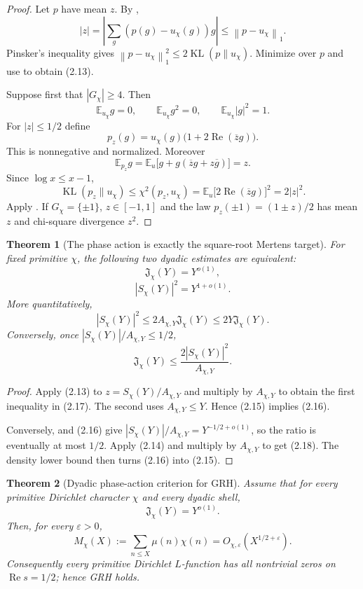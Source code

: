\documentclass[11pt]{article}
\newtheorem{theorem}{Theorem}[section]
\theoremstyle{definition}
\theoremstyle{remark}
\newcommand{\E}{\mathbb E}
\newcommand{\KL}{\operatorname{KL}}
\newcommand{\norm}[1]{\left\lVert#1\right\rVert}
\begin{document}
\begin{proof}
Let $p$ have mean $z$.  By ,
\[
 |z|
 =\left|\sum_g(p(g)-u_\chi(g))g\right|
 \le\norm{p-u_\chi}_1.
\]
Pinsker's inequality gives
$\norm{p-u_\chi}_1^2\le2\KL(p\|u_\chi)$.  Minimize over $p$ and use
 to obtain \textup{(2.13)}.

Suppose first that $|G_\chi|\ge4$.  Then
\[
 \E_{u_\chi}g=0,
 \qquad
 \E_{u_\chi}g^2=0,
 \qquad
 \E_{u_\chi}|g|^2=1.
\]
For $|z|\le1/2$ define
\[
 p_z(g)=u_\chi(g)\bigl(1+2\operatorname{Re}(\overline zg)\bigr).
\]
This is nonnegative and normalized.  Moreover
\[
 \E_{p_z}g
 =\E_u\bigl[g+g(\overline zg+z\overline g)\bigr]=z.
\]
Since $\log x\le x-1$,
\[
 \KL(p_z\|u_\chi)
 \le\chi^2(p_z,u_\chi)
 =\E_u\bigl[2\operatorname{Re}(\overline zg)\bigr]^2
 =2|z|^2.
\]
Apply .  If
$G_\chi=\{\pm1\}$, $z\in[-1,1]$ and the law
$p_z(\pm1)=(1\pm z)/2$ has mean $z$ and chi-square divergence $z^2$.
\end{proof}

\begin{theorem}[The phase action is exactly the square-root Mertens target]
\label{thm:action-Mertens-equivalence}
For fixed primitive $\chi$, the following two dyadic estimates are equivalent:
\[
 \boxed{\mathfrak J_\chi(Y)=Y^{o(1)},}
 \tag{2.15}
\]
\[
 \boxed{|S_\chi(Y)|^2=Y^{1+o(1)}.}
 \tag{2.16}
\]
More quantitatively,
\[
 \boxed{|S_\chi(Y)|^2
 \le2A_{\chi,Y}\mathfrak J_\chi(Y)
 \le2Y\mathfrak J_\chi(Y).}
 \tag{2.17}
\]
Conversely, once $|S_\chi(Y)|/A_{\chi,Y}\le1/2$,
\[
 \boxed{\mathfrak J_\chi(Y)
 \le\frac{2|S_\chi(Y)|^2}{A_{\chi,Y}}.}
 \tag{2.18}
\]
\end{theorem}

\begin{proof}
Apply \textup{(2.13)} to $z=S_\chi(Y)/A_{\chi,Y}$ and multiply by
$A_{\chi,Y}$ to obtain the first inequality in \textup{(2.17)}.  The second
uses $A_{\chi,Y}\le Y$.  Hence \textup{(2.15)} implies
\textup{(2.16)}.

Conversely,  and \textup{(2.16)} give
$|S_\chi(Y)|/A_{\chi,Y}=Y^{-1/2+o(1)}$, so the ratio is eventually at most
$1/2$.  Apply \textup{(2.14)} and multiply by $A_{\chi,Y}$ to get
\textup{(2.18)}.  The density lower bound then turns \textup{(2.16)} into
\textup{(2.15)}.
\end{proof}

\begin{theorem}[Dyadic phase-action criterion for GRH]
\label{thm:phase-action-GRH}
Assume that for every primitive Dirichlet character $\chi$ and every dyadic
shell,
\[
 \mathfrak J_\chi(Y)=Y^{o(1)}.
 \tag{2.19}
\]
Then, for every $\varepsilon>0$,
\[
 \boxed{
 M_\chi(X):=\sum_{n\le X}\mu(n)\chi(n)
 =O_{\chi,\varepsilon}(X^{1/2+\varepsilon}).}
 \tag{2.20}
\]
Consequently every primitive Dirichlet $L$-function has all nontrivial zeros
on $\operatorname{Re}s=1/2$; hence GRH holds.
\end{theorem}
\end{document}
